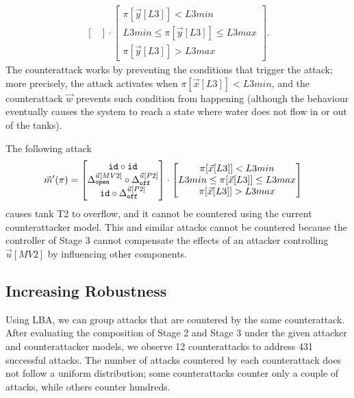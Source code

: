{{\begin{align*}
\begin{bmatrix}
  \end{bmatrix}
  \cdot
  \begin{bmatrix}
    \pi[\vec{y}[L3]]<L3min \\
    L3min \leq \pi[\vec{y}[L3]]\leq L3max \\
    \pi[\vec{y}[L3]]>L3max
  \end{bmatrix}.
\end{align*} 
The counterattack works by preventing the conditions that trigger the attack; more precisely, the attack activates when $\pi[\vec{x}[L3]]<L3min$, and the counterattack $\vec{w}$ prevents such condition from happening (although the behaviour eventually causes the system to reach a state where water does not flow in or out of the tanks). 

The following attack
\begin{align*}
    \vec{m}'(\pi)&=
    \begin{bmatrix}
     {\texttt{id}}\circ {\texttt{id}} \\
     {\Delta}^{\vec{u}[MV2]}_{\texttt{open}}\circ {\Delta}^{\vec{u}[P2]}_{\texttt{off}} \\
     {\texttt{id}}\circ {\Delta}^{\vec{u}[P2]}_{\texttt{off}} \\
    \end{bmatrix}
    \cdot
    \begin{bmatrix}
      \pi[\vec{x}[L3]]<L3min \\
      L3min \leq \pi[\vec{x}[L3]]\leq L3max \\
      \pi[\vec{x}[L3]]>L3max
    \end{bmatrix}
  \end{align*} 
causes tank T2 to overflow, and it cannot be countered using the current counterattacker model. This and similar attacks cannot be countered because the controller of Stage 3 cannot compensate the effects of an attacker controlling $\vec{u}[MV2]$ by influencing other components. 

\subsection{Increasing Robustness}
Using LBA, we can group attacks that are countered by the same counterattack. After evaluating the composition of Stage 2 and Stage 3 under the given attacker and counterattacker models, we observe 12 counterattacks to address 431 successful attacks. The number of attacks countered by each counterattack does not follow a uniform distribution; some counterattacks counter only a couple of attacks, while others counter hundreds. 

}}
